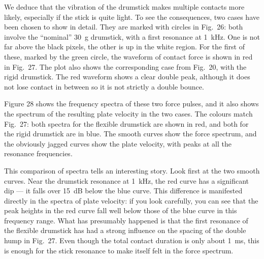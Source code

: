 
  We deduce that the vibration of the drumstick makes multiple contacts more 
  likely, especially if the stick is quite light. To see the consequences, two 
  cases have been chosen to show in detail. They are marked with circles in 
  Fig.\ 26: both involve the “nominal” 30~g drumstick, with a first resonance 
  at 1~kHz. One is not far above the black pixels, the other is up in the white 
  region. For the first of these, marked by the green circle, the waveform of 
  contact force is shown in red in Fig.\ 27. The plot also shows the 
  corresponding case from Fig.\ 20, with the rigid drumstick. The red waveform 
  shows a clear double peak, although it does not lose contact in between so it 
  is not strictly a double bounce. 


  Figure 28 shows the frequency spectra of these two force pulses, and it also 
  shows the spectrum of the resulting plate velocity in the two cases. The 
  colours match Fig.\ 27: both spectra for the flexible drumstick are shown in 
  red, and both for the rigid drumstick are in blue. The smooth curves show the 
  force spectrum, and the obviously jagged curves show the plate velocity, with 
  peaks at all the resonance frequencies. 


  This comparison of spectra tells an interesting story. Look first at the two 
  smooth curves. Near the drumstick resonance at 1~kHz, the red curve has a 
  significant dip — it falls over 15~dB below the blue curve. This difference 
  is manifested directly in the spectra of plate velocity: if you look 
  carefully, you can see that the peak heights in the red curve fall well below 
  those of the blue curve in this frequency range. What has presumably happened 
  is that the first resonance of the flexible drumstick has had a strong 
  influence on the spacing of the double hump in Fig.\ 27. Even though the 
  total contact duration is only about 1~ms, this is enough for the stick 
  resonance to make itself felt in the force spectrum. 

